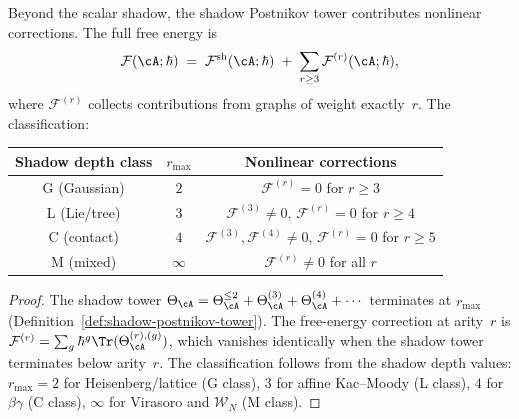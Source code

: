 \begin{proposition}%
\label{prop:g1-nonlinear-corrections}%
%
%
Beyond the scalar shadow, the shadow Postnikov tower contributes
nonlinear corrections.  The full free energy is
\begin{equation}\label{eq:g1-full-free-energy}
\mathcal{F}(\cA;\hbar)
\;=\;
\mathcal{F}^{\mathrm{sh}}(\cA;\hbar)
\;+\;
\sum_{r \geq 3}
\mathcal{F}^{(r)}(\cA;\hbar),
\end{equation}
where $\mathcal{F}^{(r)}$ collects contributions from graphs of
weight exactly~$r$.  The classification:
\begin{center}
\renewcommand{\arraystretch}{1.3}
\begin{tabular}{c|c|c}
Shadow depth class & $r_{\max}$ & Nonlinear corrections
\\[2pt]\hline\hline
G \textup{(}Gaussian\textup{)} & $2$ &
  $\mathcal{F}^{(r)} = 0$ for $r \geq 3$ \\
L \textup{(}Lie/tree\textup{)} & $3$ &
  $\mathcal{F}^{(3)} \neq 0$,
  $\mathcal{F}^{(r)} = 0$ for $r \geq 4$ \\
C \textup{(}contact\textup{)} & $4$ &
  $\mathcal{F}^{(3)}, \mathcal{F}^{(4)} \neq 0$,
  $\mathcal{F}^{(r)} = 0$ for $r \geq 5$ \\
M \textup{(}mixed\textup{)} & $\infty$ &
  $\mathcal{F}^{(r)} \neq 0$ for all $r$
\end{tabular}
\end{center}
\end{proposition}

\begin{proof}
The shadow tower
$\Theta_\cA = \Theta_\cA^{\leq 2} + \Theta_\cA^{(3)} +
\Theta_\cA^{(4)} + \cdots$ terminates at $r_{\max}$
(Definition~\ref{def:shadow-postnikov-tower}).  The
free-energy correction at arity~$r$ is
$\mathcal{F}^{(r)} = \sum_g \hbar^g \Tr(\Theta_\cA^{(r),(g)})$,
which vanishes identically when the shadow tower terminates
below arity~$r$.  The classification follows from the shadow
depth values: $r_{\max} = 2$ for Heisenberg/lattice (G class),
$3$ for affine Kac--Moody (L class), $4$ for $\beta\gamma$
(C class), $\infty$ for Virasoro and $\mathcal{W}_N$ (M class).
\end{proof}

%
%

